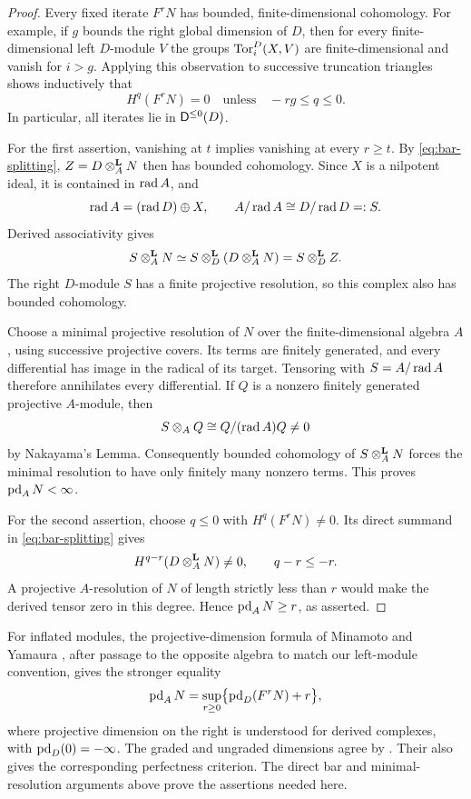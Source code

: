 \begin{proof}
Every fixed iterate \(F^rN\) has bounded,
finite-dimensional cohomology.
For example, if \(g\) bounds the right global dimension
of \(D\), then for every finite-dimensional left
\(D\)-module \(V\) the groups
\(\operatorname{Tor}_i^D(X,V)\) are finite-dimensional and vanish for
\(i>g\).  Applying this observation to successive
truncation triangles shows inductively that
\[
H^q(F^rN)=0\quad\text{unless}\quad -rg\le q\le0.
\]
In particular, all iterates lie in \(\mathsf D^{\le0}(D)\).

For the first assertion, vanishing at \(t\) implies
vanishing at every \(r\ge t\).
By \eqref{eq:bar-splitting},
\(Z=D\otimes^{\mathbf L}_AN\) then has bounded cohomology.
Since \(X\) is a nilpotent ideal, it is contained in
\(\operatorname{rad} A\), and
\[
\operatorname{rad} A=(\operatorname{rad} D)\oplus X,
\qquad A/\operatorname{rad} A\cong D/\operatorname{rad} D=:S.
\]
Derived associativity gives
\[
S\otimes^{\mathbf L}_A N
\simeq S\otimes^{\mathbf L}_D(D\otimes^{\mathbf L}_A N)
=S\otimes^{\mathbf L}_D Z.
\]
The right \(D\)-module \(S\) has a finite projective
resolution, so this complex also has bounded cohomology.

Choose a minimal projective resolution of \(N\) over
the finite-dimensional algebra \(A\), using successive
projective covers.  Its terms are finitely generated,
and every differential has image in the radical of
its target.  Tensoring with \(S=A/\operatorname{rad} A\) therefore
annihilates every differential.  If \(Q\) is a nonzero
finitely generated projective \(A\)-module, then
\[
S\otimes_A Q\cong Q/(\operatorname{rad} A)Q\ne0
\]
by Nakayama's Lemma.  Consequently bounded cohomology
of \(S\otimes^{\mathbf L}_AN\) forces the minimal resolution to have
only finitely many nonzero terms.  This proves
\(\operatorname{pd}_A N<\infty\).

For the second assertion, choose \(q\le0\) with
\(H^q(F^rN)\ne0\).  Its direct summand in
\eqref{eq:bar-splitting} gives
\[
H^{q-r}(D\otimes^{\mathbf L}_A N)\ne0,\qquad q-r\le-r.
\]
A projective \(A\)-resolution of \(N\) of length
strictly less than \(r\) would make the derived
tensor zero in this degree.  Hence
\(\operatorname{pd}_A N\ge r\), as asserted.
\end{proof}

\begin{remark}
For inflated modules, the projective-dimension formula
of Minamoto and Yamaura
\cite[Corollary~4.11]{MinamotoYamaura}, after passage
to the opposite algebra to match our left-module
convention, gives the stronger equality
\[
\operatorname{pd}_A N
=\sup_{r\ge0}\bigl\{\operatorname{pd}_D(F^rN)+r\bigr\},
\]
where projective dimension on the right is understood
for derived complexes, with \(\operatorname{pd}_D(0)=-\infty\).
The graded and ungraded dimensions
agree by \cite[Proposition~2.5 and Lemma~3.6]{MinamotoYamaura}.
Their
\cite[Theorem~4.17]{MinamotoYamaura} also gives the
corresponding perfectness criterion.
The direct bar and minimal-resolution arguments above
prove the assertions needed here.
\end{remark}

